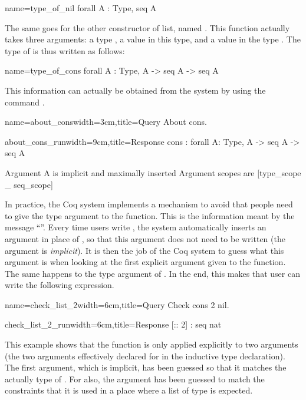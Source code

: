 \begin{coq}{name=type_of_nil}{}
  forall A : Type, seq A
\end{coq}
The same goes for the other constructor of list, named .  This
function actually takes three arguments: a type , a value in this
type, and a value in the type .  The type of  is
thus written as follows:

\begin{coq}{name=type_of_cons}{}
  forall A : Type, A -> seq A -> seq A
\end{coq}
This information can actually be obtained from the system by using the 
command .

\begin{coq}{name=about_cons}{width=3cm,title=Query}
About cons.
$~$
$~$
$~$
\end{coq}
\begin{coqout}{about_cons_run}{width=9cm,title=Response}
cons : forall A: Type, A -> seq A -> seq A

Argument A is implicit and maximally inserted
Argument scopes are [type_scope _ seq_scope]
\end{coqout}
In practice, the Coq system implements a mechanism to avoid that
people need to give the type argument to the  function.  This is
the information meant by the message ``''.  Every time users write , the system automatically
inserts an argument in place of , so that this argument does not
need to be written (the argument is {\em implicit}).  It is then the
job of the Coq system to guess what this argument is when looking at
the first explicit argument given to the function.  The same happens
to the type argument of .  In the end, this makes that user can
write the following expression.

\begin{coq}{name=check_list_2}{width=6cm,title=Query}
Check cons 2 nil.
\end{coq}
\begin{coqout}{check_list_2_run}{width=6cm,title=Response}
[:: 2] : seq nat
\end{coqout}
This example shows that the function  is only applied
explicitly to two arguments (the two arguments effectively declared
for  in the inductive type declaration).
The first argument, which is implicit,
has been guessed so that it matches the actually type of .  For 
 also, the argument has been guessed to match the constraints
that it is used in a place where a list of type  is expected.  

